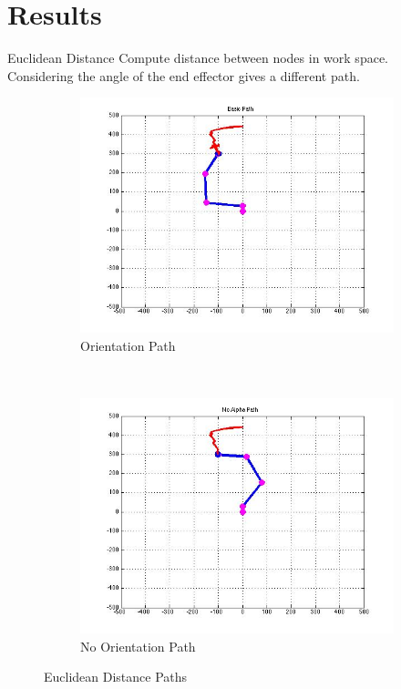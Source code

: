 \documentclass{beamer}
\begin{document}
\section{Results}
\begin{frame}{Euclidean Distance}
Compute distance between nodes in work space.\\
Considering the angle of the end effector gives a different path.
\begin{figure}[htb]
\centering
\begin{subfigure}[b]{0.5\textwidth}
\centering
\includegraphics[scale=.3]{PathPics/Basic_Path.jpg}
\caption{Orientation Path}
\end{subfigure}%
~ 
\begin{subfigure}[b]{0.5\textwidth}
\centering
\includegraphics[scale=.3]{PathPics/NoAlpha_Path.jpg}
\caption{No Orientation Path}
\end{subfigure}

\caption{Euclidean Distance Paths}
\label{fig:basicPaths}
\end{figure} 

\end{frame}
\end{document}

